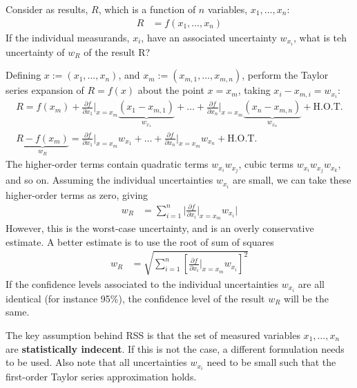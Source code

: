 Consider as results, $R$, which is a function of $n$ variables, $x_1, \ldots, x_n$:
\begin{align*}
    R &= f(x_1, \ldots, x_n)
\end{align*}
If the individual measurands, $x_i$, have an associated uncertainty $w_{x_i}$, what is teh uncertainty of $w_R$ of the result R?

Defining $x:= (x_1, \ldots, x_n)$, and $x_m := (x_{m, 1}, \ldots, x_{m, n})$, perform the Taylor series expansion of $R= f(x)$ about the point $x = x_m$, taking $x_i - x_{m, i} = w_{x_i}$:
\begin{gather*}
    R = f(x_m) + \frac{\partial f}{\partial x_1} \bigg|_{x = x_m} \underbrace{(x_1 - x_{m, 1})}_{w_{x_1}} + \ldots + \frac{\partial f}{\partial x_n} \bigg|_{x = x_m} \underbrace{(x_n - x_{m, n})}_{w_{x_n}} + \text{H.O.T.} \\
    \underbrace{R - f(x_m)}_{w_R} = \frac{\partial f}{\partial x_1} \bigg|_{x = x_m} w_{x_1} + \ldots + \frac{\partial f}{\partial x_n} \bigg|_{x = x_m} w_{x_n} + \text{H.O.T.}
\end{gather*}
The higher-order terms contain quadratic terms $w_{x_i}w_{x_j}$, cubic terms $w_{x_i}w_{x_j}w_{x_k}$, and so on. Assuming the individual uncertainties $w_{x_i}$ are small,  we can take these higher-order terms as zero, giving 
\begin{align*}
    w_R &= \sum_{i=1}^n \bigg|\frac{\partial f}{\partial x_i} \bigg|_{x = x_m} w_{x_i} \bigg|
\end{align*}
However, this is the worst-case uncertainty, and is an overly conservative estimate. A better estimate is to use the root of sum of squares
\begin{align}
    w_R &= \sqrt{\sum_{i=1}^n \left[\frac{\partial f}{\partial x_i} \bigg|_{x = x_m} w_{x_i}\right]^2} \label{eq:error_propagation}
\end{align}
If the confidence levels associated to the individual uncertainties $w_{x_i}$ are all identical (for instance 95\%), the confidence level of the result $w_R$ will be the same. 

The key assumption behind RSS is that the set of measured variables $x_1, \ldots, x_n$ are \textbf{statistically indecent}. If this is not the case, a different formulation needs to be used. Also note that all uncertainties $w_{x_i}$ need to be small such that the first-order Taylor series approximation holds. 

